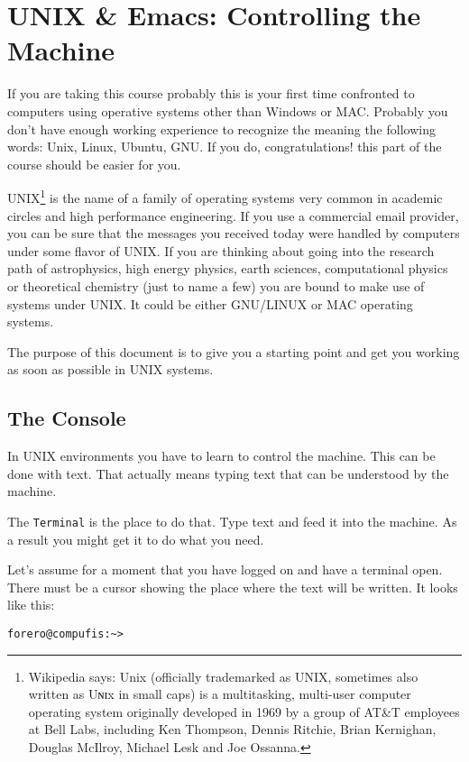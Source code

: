 \documentclass{article}
\begin{document}
\section{UNIX \& Emacs: Controlling the Machine}

If you are taking this course probably this is your first time
confronted to computers using operative systems other than Windows or
MAC. Probably you don't have enough working experience to recognize
the meaning the following words: Unix, Linux, Ubuntu, GNU. If you do,
congratulations! this part of the course should be easier for you. 

UNIX\footnote{Wikipedia says: Unix (officially trademarked as UNIX,
  sometimes also written as Uɴɪx in small caps) is a multitasking,
  multi-user computer operating system originally developed in 1969 by
  a group of AT\&T employees at Bell Labs, including Ken Thompson,
  Dennis Ritchie, Brian Kernighan, Douglas McIlroy, Michael Lesk and
  Joe Ossanna.} is the name of a family of operating systems very
common in academic circles and high performance engineering. If you
use a commercial email provider, you can be sure that the messages you
received today were handled by computers under some flavor of UNIX. If
you are thinking about going into the research path of astrophysics,
high energy physics, earth sciences, computational physics or
theoretical chemistry (just to name a few) you are bound to make use
of systems under UNIX. It could be either GNU/LINUX or MAC operating
systems. 

The purpose of this document is to give you a starting point and get
you working as soon as possible in UNIX systems. 

\subsection{The Console}
In UNIX environments you have to learn to control the machine. This
can be done with text. That actually means typing text that can be
understood by the machine. 

The {\tt Terminal} is the place to do that. Type text and feed it into
the machine. As a result you might get it to do what you need.  

Let's assume for a moment that you have logged on and have a terminal
open. There must be a cursor showing the place where the text will be
written. It looks like this: 

\begin{verbatim}
forero@compufis:~>
\end{verbatim}
\end{document}
